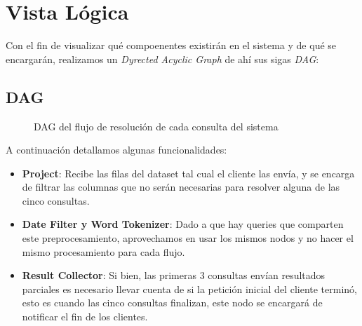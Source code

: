 \section{Vista Lógica}
Con el fin de visualizar qué compoenentes existirán en el sistema y de qué se encargarán, realizamos un \textit{Dyrected Acyclic Graph} de ahí sus sigas \emph{DAG}: 
\subsection{DAG}
\label{subsec:dag}
\begin{figure}[H]
    \centering
    
    \caption{DAG del flujo de resolución de cada consulta del sistema}
    \label{fig:dag}
\end{figure}

A continuación detallamos algunas funcionalidades:
\begin{itemize}
    \item \textbf{Project}: Recibe las filas del dataset tal cual el cliente las envía, y se encarga de filtrar las columnas que no serán necesarias para resolver alguna de las cinco consultas.
    \item \textbf{Date Filter y Word Tokenizer}: Dado a que hay queries que comparten este preprocesamiento, aprovechamos en usar los mismos nodos y no hacer el mismo procesamiento para cada flujo.
    \item \textbf{Result Collector}: Si bien, las primeras 3 consultas envían resultados parciales es necesario llevar cuenta de si la petición inicial del cliente terminó, esto es cuando las cinco consultas finalizan, este nodo se encargará de notificar el fin de los clientes.
\end{itemize}